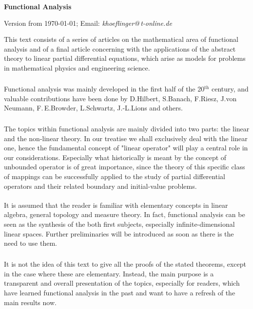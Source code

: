 \documentclass[11pt,twoside]{article}
\begin{document}
\thispagestyle{empty}

\centerline{\Large{\textbf{Functional Analysis}}}

\vspace{5pt}
\centerline{\small{\textsc{\Author}}}
\vspace{20pt}

\myfootnote
{
  Version {\Version} from \today;
  Email:  \textit{khoeflinger@\,t-online.de}
}

This text consists of a series of articles
on the mathematical area of {functional analysis}
and of a final article concerning with the applications of the abstract theory
to linear partial differential equations,
which arise as models for problems
in mathematical physics and engineering science.

\subparagraph{}
Functional analysis was mainly developed
in the first half of the 20$^{\textrm{th}}$ century,
and valuable contributions have been done by
{D.\;Hilbert},
{S.\;Banach},
{F.\;Riesz},
{J.\;von Neumann},
{F.\,E.\;Browder},
{L.\;Schwartz},
{J.-L.\;Lions} and others.

\subparagraph{}
The topics within functional analysis are mainly divided into two parts:
the linear and the non-linear theory.
In our treatise we shall exclusively deal with the linear one,
hence the fundamental concept of {"linear operator"}
will play a central role in our considerations.
Especially
what historically is meant by the concept of unbounded operator
is of great importance,
since the theory of this specific class of mappings can be successfully applied
to the study of partial differential operators
and their related boundary and initial-value problems.

\paragraph{}
It is assumed that
the reader is familiar with elementary concepts in linear algebra,
general topology and measure theory.
In fact,
functional analysis can be seen as the synthesis of the both first subjects,
especially {\wrt} infinite-dimensional linear spaces.
Further preliminaries
will be introduced as soon as there is the need to use them.

\subparagraph{}
It is not the idea of this text to give all the proofs of the stated theorems,
except in the case where these are elementary.
Instead,
the main purpose is a transparent and overall presentation of the topics,
especially for readers, which have learned functional analysis in the past
and want to have a refresh of the main results now.
\end{document}
